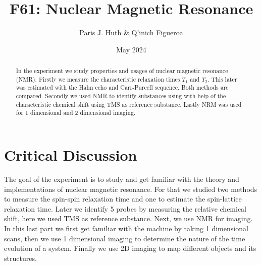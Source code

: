 \documentclass[11 pt]{article}
\title{F61: Nuclear Magnetic Resonance}
\author{Paris J. Huth \& Q'inich Figueroa}
\date{May 2024}
\begin{document}
\maketitle
\begin{center}
\begin{abstract}
In the experiment we study properties and usages of nuclear magnetic resonance (NMR). Firstly we measure the characteristic relaxation times $T_1$ and $T_2$. This later was estimated with the Hahn echo and Carr-Purcell sequence. Both methods are compared. Secondly we used NMR to identify substances using with help of the characteristic chemical shift using TMS as reference substance. Lastly NRM was used for 1 dimensional and 2 dimensional imaging.  
\end{abstract}
\end{center}




\section{Critical Discussion}
The goal of the experiment is to study and get familiar with the theory and implementations of nuclear magnetic resonance. For that we studied two methods to measure the spin-spin relaxation time and one to estimate the spin-lattice relaxation time. Later we identify 5 probes by measuring the relative chemical shift, here we used TMS as reference substance. Next, we use NMR for imaging. In this last part we first get familiar with the machine by taking 1 dimensional scans, then we use 1 dimensional imaging to determine the nature of the time evolution of a system. Finally we use 2D imaging to map different objects and its structures. 





\end{document}
